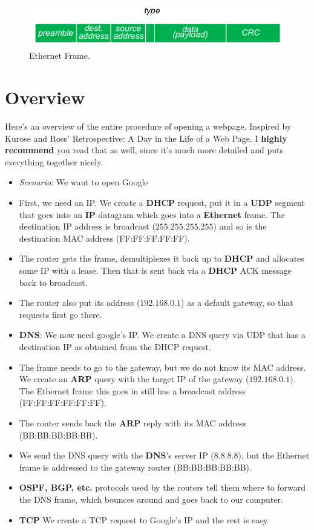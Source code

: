 \documentclass{article}
\begin{document}
\begin{figure}
    \centering
    \includegraphics[width=1\textwidth]{figures/ethernet.png}
    \caption{Ethernet Frame.}
    \label{fig:ethernet}
\end{figure}

\section{Overview}
Here's an overview of the entire procedure of opening a webpage. Inspired by Kurose and Ross' Retrospective: A Day in the Life of a Web Page. I \textbf{highly recommend} you read that as well, since it's much more detailed and puts everything together nicely.

\begin{itemize}
    \item \textit{Scenario}: We want to open Google
    \item First, we need an IP. We create a \textbf{DHCP} request, put it in a \textbf{UDP} segment that goes into an \textbf{IP} datagram which goes into a \textbf{Ethernet} frame. The destination IP address is broadcast ($255.255.255.255$) and so is the destination MAC address (FF:FF:FF:FF:FF).
    \item The router gets the frame, demultiplexes it back up to \textbf{DHCP} and allocates some IP with a lease. Then that is sent back via a \textbf{DHCP} ACK message back to broadcast.
    \item The router also put its address ($192.168.0.1$) as a default gateway, so that requests first go there.
    \item \textbf{DNS}: We now need google's IP. We create a DNS query via UDP that has a destination IP as obtained from the DHCP request.
    \item The frame needs to go to the gateway, but we do not know its MAC address. We create an \textbf{ARP} query with the target IP of the gateway ($192.168.0.1$). The Ethernet frame this goes in still has a broadcast address (FF:FF:FF:FF:FF:FF).
    \item The router sends back the \textbf{ARP} reply with its MAC address (BB:BB:BB:BB:BB).
    \item We send the DNS query with the \textbf{DNS}'s server IP ($8.8.8.8$), but the Ethernet frame is addressed to the gateway router (BB:BB:BB:BB:BB).
    \item \textbf{OSPF, BGP, etc.} protocols used by the routers tell them where to forward the DNS frame, which bounces around and goes back to our computer.
    \item \textbf{TCP} We create a TCP request to Google's IP and the rest is easy.
\end{itemize}
\end{document}
